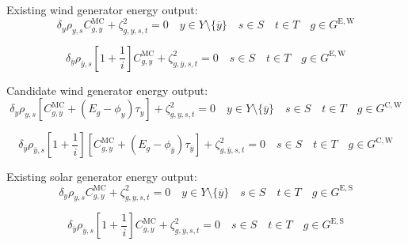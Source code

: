 \documentclass{article}
\newcommand{\sGeneratorsExistingWind}{G^{\mathrm{E,W}}}
\newcommand{\sGeneratorsExistingSolar}{G^{\mathrm{E,S}}}
\newcommand{\sGeneratorsCandidateWind}{G^{\mathrm{C,W}}}
\newcommand{\sYears}{Y}
\newcommand{\sScenarios}{S}
\newcommand{\sIntervals}{T}
\newcommand{\iGenerator}{g}
\newcommand{\iYear}{y}
\newcommand{\iYearTerminal}{\overline{\iYear}}
\newcommand{\iScenario}{s}
\newcommand{\iInterval}{t}
\newcommand{\cScenarioDuration}[1][\iYear,\iScenario]{\rho_{#1}}
\newcommand{\cMarginalCost}[1][\iGenerator,\iYear]{C^{\mathrm{MC}}_{#1}}
\newcommand{\cEmissionsIntensity}[1][\iGenerator]{E_{#1}}
\newcommand{\cInterestRate}{i}
\newcommand{\cDiscountRate}[1][\iYear]{\delta_{#1}}
\newcommand{\vBaseline}[1][\iYear]{\phi_{#1}}
\newcommand{\vPermitPrice}[1][\iYear]{\tau_{#1}}
\newcommand{\dGeneratorEnergyOutput}[1][\iGenerator,\iYear,\iScenario,\iInterval]{\zeta_{#1}^{2}}
\begin{document}
Existing wind generator energy output:
\begin{equation}
\cDiscountRate\cScenarioDuration \cMarginalCost + \dGeneratorEnergyOutput = 0 \quad \iYear \in \sYears \setminus \{\iYearTerminal\} \quad \iScenario \in \sScenarios \quad \iInterval \in \sIntervals \quad \iGenerator \in \sGeneratorsExistingWind
\end{equation}

\begin{equation}
\cDiscountRate[\iYearTerminal] \cScenarioDuration[\iYearTerminal,\iScenario] \left[1 + \frac{1}{\cInterestRate}\right] \cMarginalCost + \dGeneratorEnergyOutput[\iGenerator,\iYearTerminal,\iScenario,\iInterval] = 0 \quad \iScenario \in \sScenarios \quad \iInterval \in \sIntervals \quad \iGenerator \in \sGeneratorsExistingWind
\end{equation}

Candidate wind generator energy output:
\begin{equation}
\cDiscountRate\cScenarioDuration \left[\cMarginalCost + \left(\cEmissionsIntensity - \vBaseline\right)\vPermitPrice \right] + \dGeneratorEnergyOutput = 0 \quad \iYear \in \sYears \setminus \{\iYearTerminal\} \quad \iScenario \in \sScenarios \quad \iInterval \in \sIntervals \quad \iGenerator \in \sGeneratorsCandidateWind
\end{equation}

\begin{equation}
\cDiscountRate[\iYearTerminal] \cScenarioDuration[\iYearTerminal,\iScenario] \left[1 + \frac{1}{\cInterestRate}\right] \left[\cMarginalCost + \left(\cEmissionsIntensity - \vBaseline[\iYearTerminal]\right)\vPermitPrice[\iYearTerminal] \right] + \dGeneratorEnergyOutput[\iGenerator,\iYearTerminal,\iScenario,\iInterval] = 0 \quad \iScenario \in \sScenarios \quad \iInterval \in \sIntervals  \quad \iGenerator \in \sGeneratorsCandidateWind
\end{equation}

Existing solar generator energy output:
\begin{equation}
\cDiscountRate\cScenarioDuration \cMarginalCost + \dGeneratorEnergyOutput = 0 \quad \iYear \in \sYears \setminus \{\iYearTerminal\} \quad \iScenario \in \sScenarios \quad \iInterval \in \sIntervals \quad \iGenerator \in \sGeneratorsExistingSolar
\end{equation}

\begin{equation}
\cDiscountRate[\iYearTerminal] \cScenarioDuration[\iYearTerminal,\iScenario] \left[1 + \frac{1}{\cInterestRate}\right] \cMarginalCost + \dGeneratorEnergyOutput[\iGenerator,\iYearTerminal,\iScenario,\iInterval] = 0 \quad \iScenario \in \sScenarios \quad \iInterval \in \sIntervals \quad \iGenerator \in \sGeneratorsExistingSolar
\end{equation}
\end{document}
